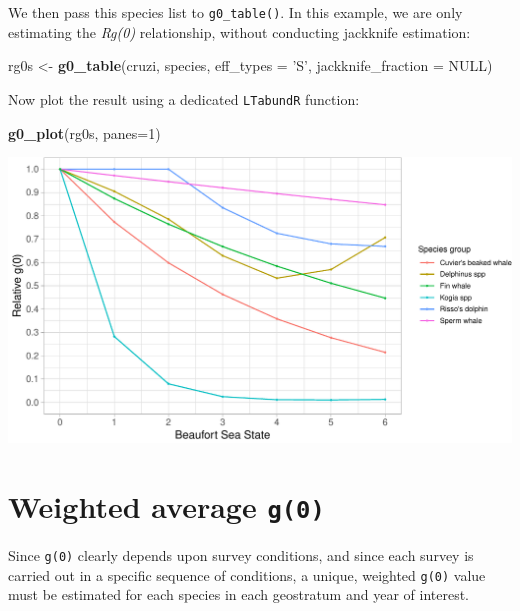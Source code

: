 \documentclass[
]{book}
\newenvironment{Shaded}{\begin{snugshade}}{\end{snugshade}}
\newcommand{\DataTypeTok}[1]{\textcolor[rgb]{0.13,0.29,0.53}{#1}}
\newcommand{\DecValTok}[1]{\textcolor[rgb]{0.00,0.00,0.81}{#1}}
\newcommand{\KeywordTok}[1]{\textcolor[rgb]{0.13,0.29,0.53}{\textbf{#1}}}
\newcommand{\NormalTok}[1]{#1}
\newcommand{\OtherTok}[1]{\textcolor[rgb]{0.56,0.35,0.01}{#1}}
\newcommand{\StringTok}[1]{\textcolor[rgb]{0.31,0.60,0.02}{#1}}
\begin{document}
We then pass this species list to \texttt{g0\_table()}. In this example, we are only estimating the \emph{Rg(0)} relationship, without conducting jackknife estimation:

\begin{Shaded}
\begin{Highlighting}[]
\NormalTok{rg0s <-}\StringTok{ }\KeywordTok{g0_table}\NormalTok{(cruzi,}
\NormalTok{               species,}
               \DataTypeTok{eff_types =} \StringTok{'S'}\NormalTok{,}
               \DataTypeTok{jackknife_fraction =} \OtherTok{NULL}\NormalTok{)}
\end{Highlighting}
\end{Shaded}

Now plot the result using a dedicated \texttt{LTabundR} function:

\begin{Shaded}
\begin{Highlighting}[]
\KeywordTok{g0_plot}\NormalTok{(rg0s, }\DataTypeTok{panes=}\DecValTok{1}\NormalTok{)}
\end{Highlighting}
\end{Shaded}

\includegraphics{figures/unnamed-chunk-209-1.pdf}

\hypertarget{weighted-average-g0}{%
\section*{\texorpdfstring{Weighted average \texttt{g(0)}}{Weighted average g(0)}}\label{weighted-average-g0}}

Since \texttt{g(0)} clearly depends upon survey conditions, and since each survey is carried out in a specific sequence of conditions, a unique, weighted \texttt{g(0)} value must be estimated for each species in each geostratum and year of interest.
\end{document}
